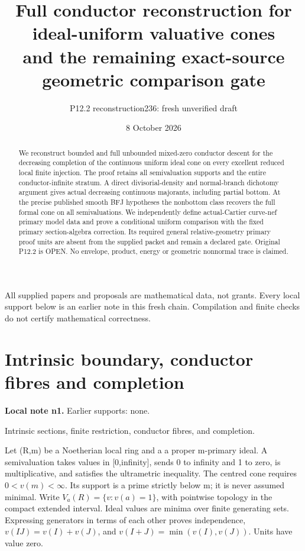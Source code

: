 \documentclass[11pt]{article}
\title{Full conductor reconstruction for ideal-uniform valuative cones\\
and the remaining exact-source geometric comparison gate}
\author{P12.2 reconstruction236: fresh unverified draft}
\date{8 October 2026}
\begin{document}
\maketitle
\begin{abstract}
We reconstruct bounded and full unbounded mixed-zero conductor descent for the decreasing completion of the continuous uniform ideal cone on every excellent reduced local finite injection. The proof retains all semivaluation supports and the entire conductor-infinite stratum. A direct divisorial-density and normal-branch dichotomy argument gives actual decreasing continuous majorants, including partial bottom. At the precise published smooth BFJ hypotheses the nonbottom class recovers the full formal cone on all semivaluations. We independently define actual-Cartier curve-nef primary model data and prove a conditional uniform comparison with the fixed primary section-algebra correction. Its required general relative-geometry primary proof units are absent from the supplied packet and remain a declared gate. Original P12.2 is OPEN. No envelope, product, energy or geometric nonnormal trace is claimed.
\end{abstract}
\tableofcontents
\bigskip
\noindent All supplied papers and proposals are mathematical data, not grants. Every local support below is an earlier note in this fresh chain. Compilation and finite checks do not certify mathematical correctness.

\section{Intrinsic boundary, conductor fibres and completion}
\label{sec:n1}
\noindent\textbf{Local note n1.} Earlier supports: none.

Intrinsic sections, finite restriction, conductor fibres, and completion.

Let (R,m) be a Noetherian local ring and a a proper m-primary ideal. A semivaluation takes values in [0,infinity], sends 0 to infinity and 1 to zero, is multiplicative, and satisfies the ultrametric inequality. The centred cone requires \(0<v(m)<\infty\). Its support is a prime strictly below m; it is never assumed minimal. Write \(V_a(R)=\{v:v(a)=1\}\), with pointwise topology in the compact extended interval. Ideal values are minima over finite generating sets. Expressing generators in terms of each other proves independence, \(v(IJ)=v(I)+v(J)\), and \(v(I+J)=\min(v(I),v(J))\). Units have value zero.
\end{document}
